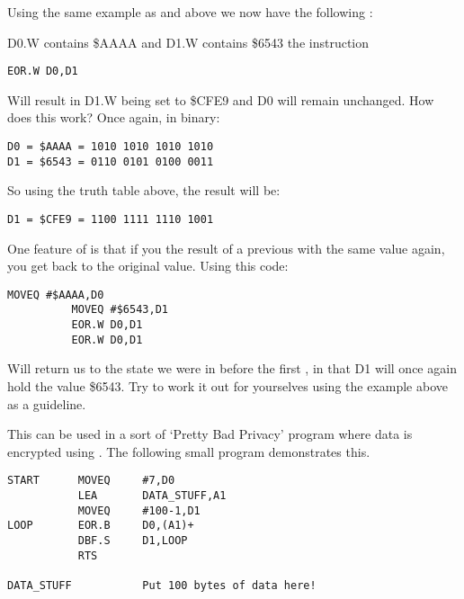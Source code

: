 Using the same example as  and  above we now have the following
   :

D0.W contains \$AAAA and D1.W contains \$6543 the instruction

\begin{lstlisting}[firstnumber=1,]
          EOR.W D0,D1
\end{lstlisting}

Will result in D1.W being set to \$CFE9 and D0 will remain unchanged.
    How does this work? Once again, in binary:

\begin{lstlisting}[firstnumber=1,frame=none,numbers=none]
D0 = $AAAA = 1010 1010 1010 1010
D1 = $6543 = 0110 0101 0100 0011
\end{lstlisting}

So using the truth table above, the result will be:

\begin{lstlisting}[firstnumber=1,frame=none,numbers=none]
D1 = $CFE9 = 1100 1111 1110 1001
\end{lstlisting}

One feature of  is that if you  the result of a previous  with the same value again, you get back to the original value. Using this
    code:

\begin{lstlisting}[firstnumber=1,]
          MOVEQ #$AAAA,D0
          MOVEQ #$6543,D1
          EOR.W D0,D1
          EOR.W D0,D1
\end{lstlisting}

Will return us to the state we were in before the first , in that
    D1 will once again hold the value \$6543. Try to work it out for yourselves
    using the example above as a guideline.

This can be used in a sort of `Pretty Bad Privacy' program where
    data is encrypted using . The following small program demonstrates
    this.

\begin{lstlisting}[firstnumber=1,caption={Pretty Bad Privacy Example},label={lst:PrettyBadPrivacy}]
START      MOVEQ     #7,D0
           LEA       DATA_STUFF,A1 
           MOVEQ     #100-1,D1
LOOP       EOR.B     D0,(A1)+
           DBF.S     D1,LOOP
           RTS

DATA_STUFF           Put 100 bytes of data here!
\end{lstlisting}

